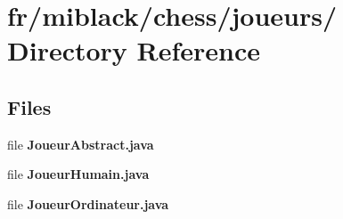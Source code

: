 \section{fr/miblack/chess/joueurs/ Directory Reference}
\label{dir_8e59cd9f163ee7760aa63b3e0033a09f}
\subsection*{Files}
\begin{DoxyCompactItemize}
\item 
file {\bfseries Joueur\-Abstract.\-java}
\item 
file {\bfseries Joueur\-Humain.\-java}
\item 
file {\bfseries Joueur\-Ordinateur.\-java}
\end{DoxyCompactItemize}

